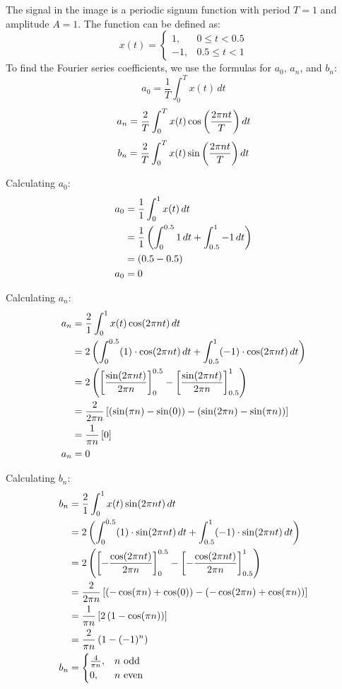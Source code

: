 \documentclass[a4paper, 10pt]{article}
\begin{document}
\begin{solution}
The signal in the image is a periodic signum function with period \( T = 1 \) and amplitude \( A = 1 \). The function can be defined as:
\[ x(t) = 
\begin{cases}
1, & 0 \leq t < 0.5 \\
-1, & 0.5 \leq t < 1
\end{cases} \]
To find the Fourier series coefficients, we use the formulas for \( a_0 \), \( a_n \), and \( b_n \):
\[ a_0 = \frac{1}{T} \int_{0}^{T} x(t) \, dt \]
\[ a_n = \frac{2}{T} \int_{0}^{T} x(t) \cos\left( \frac{2\pi n t}{T} \right) dt \]
\[ b_n = \frac{2}{T} \int_{0}^{T} x(t) \sin\left( \frac{2\pi n t}{T} \right) dt \]

Calculating \( a_0 \):
\begin{align*}
    a_0 &= \frac{1}{1} \int_{0}^{1} x(t) \, dt \\
    &= \frac{1}{1} \left( \int_{0}^{0.5} 1 \, dt + \int_{0.5}^{1} -1 \, dt \right) \\
    &= \left( 0.5 - 0.5 \right) \\
    a_0 &= 0
\end{align*}

\newpage

Calculating \( a_n \):
\begin{align*}
    a_n &= \frac{2}{1} \int_{0}^{1} x(t) \cos(2\pi n t) \, dt \\
    &= 2 \left( \int_{0}^{0.5} (1) \cdot \cos(2\pi n t) \, dt + \int_{0.5}^{1} (-1) \cdot \cos(2\pi n t) \, dt \right) \\
    &= 2 \left( \left[ \frac{\sin(2\pi n t)}{2\pi n} \right]_{0}^{0.5} - \left[ \frac{\sin(2\pi n t)}{2\pi n} \right]_{0.5}^{1} \right) \\
    &= \frac{2}{2\pi n} \left[ \left( \sin(\pi n) - \sin(0) \right) - \left( \sin(2\pi n) - \sin(\pi n) \right) \right] \\
    &= \frac{1}{\pi n} \left[ 0 \right] \\
    a_n &= 0
\end{align*}

Calculating \( b_n \):
\begin{align*}
    b_n &= \frac{2}{1} \int_{0}^{1} x(t) \sin(2\pi n t) \, dt \\
    &= 2 \left( \int_{0}^{0.5} (1) \cdot \sin(2\pi n t) \, dt + \int_{0.5}^{1} (-1) \cdot \sin(2\pi n t) \, dt \right) \\
    &= 2 \left( \left[ -\frac{\cos(2\pi n t)}{2\pi n} \right]_{0}^{0.5} - \left[ -\frac{\cos(2\pi n t)}{2\pi n} \right]_{0.5}^{1} \right) \\
    &= \frac{2}{2\pi n} \left[ \left( -\cos(\pi n) + \cos(0) \right) - \left( -\cos(2\pi n) + \cos(\pi n) \right) \right] \\
    &= \frac{1}{\pi n} \left[ 2\left( 1 - \cos(\pi n) \right) \right] \\
    &= \frac{2}{\pi n} \left( 1 - (-1)^n \right) \\
    b_n &= \begin{cases} \frac{4}{\pi n}, & n \text{ odd} \\ 0, & n \text{ even} \end{cases}
\end{align*}


\end{solution}
\end{document}
